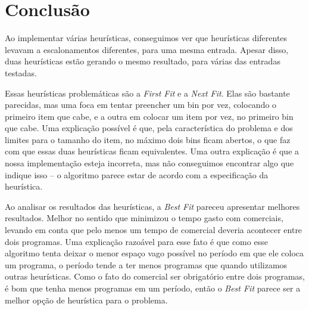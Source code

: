 \section{Conclusão}

Ao implementar várias heurísticas, conseguimos ver que heurísticas diferentes levavam a escalonamentos
diferentes, para uma mesma entrada. Apesar disso, duas heurísticas estão gerando o mesmo resultado, para
várias das entradas testadas.

Essas heurísticas problemáticas são a \textit{First Fit} e a \textit{Next Fit}. Elas são bastante parecidas,
mas uma foca em tentar preencher um bin por vez, colocando o primeiro item que cabe, e a outra em colocar um 
item por vez, no primeiro bin que cabe. Uma explicação possível é que, pela característica do problema e dos
limites para o tamanho do item, no máximo dois bins ficam abertos, o que faz com que essas duas heurísticas
ficam equivalentes. Uma outra explicação é que a nossa implementação esteja incorreta, mas não conseguimos
encontrar algo que indique isso -- o algoritmo parece estar de acordo com a especificação da heurística.

Ao analisar os resultados das heurísticas, a \textit{Best Fit} pareceu apresentar melhores resultados.
Melhor no sentido que minimizou o tempo gasto com comerciais, levando em conta que pelo menos um tempo de comercial
deveria acontecer entre dois programas. Uma explicação razoável para esse fato é que como esse algoritmo tenta
deixar o menor espaço vago possível no período em que ele coloca um programa, o período tende a ter menos programas
que quando utilizamos outras heurísticas. Como o fato do comercial ser obrigatório entre dois programas, é bom
que tenha menos programas em um período, então o \textit{Best Fit} parece ser a melhor opção de heurística
para o problema.

